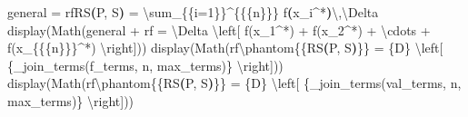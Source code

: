 \documentclass[
  letterpaper,
  DIV=11,
  numbers=noendperiod]{scrreprt}
\newenvironment{Shaded}{\begin{snugshade}}{\end{snugshade}}
\newcommand{\CharTok}[1]{\textcolor[rgb]{0.13,0.47,0.30}{#1}}
\newcommand{\DecValTok}[1]{\textcolor[rgb]{0.68,0.00,0.00}{#1}}
\newcommand{\ErrorTok}[1]{\textcolor[rgb]{0.68,0.00,0.00}{#1}}
\newcommand{\KeywordTok}[1]{\textcolor[rgb]{0.00,0.23,0.31}{\textbf{#1}}}
\newcommand{\NormalTok}[1]{\textcolor[rgb]{0.00,0.23,0.31}{#1}}
\newcommand{\OperatorTok}[1]{\textcolor[rgb]{0.37,0.37,0.37}{#1}}
\newcommand{\PreprocessorTok}[1]{\textcolor[rgb]{0.68,0.00,0.00}{#1}}
\newcommand{\SpecialCharTok}[1]{\textcolor[rgb]{0.37,0.37,0.37}{#1}}
\newcommand{\VerbatimStringTok}[1]{\textcolor[rgb]{0.13,0.47,0.30}{#1}}
\theoremstyle{plain}
\theoremstyle{plain}
\theoremstyle{definition}
\theoremstyle{definition}
\theoremstyle{definition}
\theoremstyle{plain}
\theoremstyle{plain}
\theoremstyle{remark}
\begin{document}
\begin{Shaded}
\begin{Highlighting}[]
\NormalTok{    general }\OperatorTok{=} \VerbatimStringTok{rf\textquotesingle{}RS}\KeywordTok{(}\VerbatimStringTok{P, S}\KeywordTok{)}\VerbatimStringTok{ = }\DecValTok{\textbackslash{}s}\VerbatimStringTok{um\_}\CharTok{\{\{}\VerbatimStringTok{i=1}\CharTok{\}\}}\DecValTok{\^{}}\CharTok{\{\{}\SpecialCharTok{\{}\NormalTok{n}\SpecialCharTok{\}}\CharTok{\}\}}\VerbatimStringTok{ f}\KeywordTok{(}\VerbatimStringTok{x\_i}\DecValTok{\^{}}\OperatorTok{*}\KeywordTok{)}\CharTok{\textbackslash{},}\DecValTok{\textbackslash{}D}\VerbatimStringTok{elta\textquotesingle{}}
\NormalTok{    display(Math(general }\OperatorTok{+} \VerbatimStringTok{rf\textquotesingle{} = }\DecValTok{\textbackslash{}D}\VerbatimStringTok{elta }\ErrorTok{\textbackslash{}}\VerbatimStringTok{left}\PreprocessorTok{[ f(x\_1\^{}*) + f(x\_2\^{}*) + }\ErrorTok{\textbackslash{}}\PreprocessorTok{cdots + f(x\_}\CharTok{\{\{}\SpecialCharTok{\{}\NormalTok{n}\SpecialCharTok{\}}\CharTok{\}\}}\PreprocessorTok{\^{}*) }\CharTok{\textbackslash{}r}\PreprocessorTok{ight]}\VerbatimStringTok{\textquotesingle{}}\NormalTok{))}
\NormalTok{    display(Math(}\VerbatimStringTok{rf\textquotesingle{}}\ErrorTok{\textbackslash{}}\VerbatimStringTok{phantom}\CharTok{\{\{}\VerbatimStringTok{RS}\KeywordTok{(}\VerbatimStringTok{P, S}\KeywordTok{)}\CharTok{\}\}}\VerbatimStringTok{ = }\SpecialCharTok{\{}\NormalTok{D}\SpecialCharTok{\}}\VerbatimStringTok{ }\ErrorTok{\textbackslash{}}\VerbatimStringTok{left}\PreprocessorTok{[ }\SpecialCharTok{\{}\NormalTok{\_join\_terms(f\_terms, n, max\_terms)}\SpecialCharTok{\}}\PreprocessorTok{ }\CharTok{\textbackslash{}r}\PreprocessorTok{ight]}\VerbatimStringTok{\textquotesingle{}}\NormalTok{))}
\NormalTok{    display(Math(}\VerbatimStringTok{rf\textquotesingle{}}\ErrorTok{\textbackslash{}}\VerbatimStringTok{phantom}\CharTok{\{\{}\VerbatimStringTok{RS}\KeywordTok{(}\VerbatimStringTok{P, S}\KeywordTok{)}\CharTok{\}\}}\VerbatimStringTok{ = }\SpecialCharTok{\{}\NormalTok{D}\SpecialCharTok{\}}\VerbatimStringTok{ }\ErrorTok{\textbackslash{}}\VerbatimStringTok{left}\PreprocessorTok{[ }\SpecialCharTok{\{}\NormalTok{\_join\_terms(val\_terms, n, max\_terms)}\SpecialCharTok{\}}\PreprocessorTok{ }\CharTok{\textbackslash{}r}\PreprocessorTok{ight]}\VerbatimStringTok{\textquotesingle{}}\NormalTok{))}


\end{Highlighting}
\end{Shaded}
\end{document}
